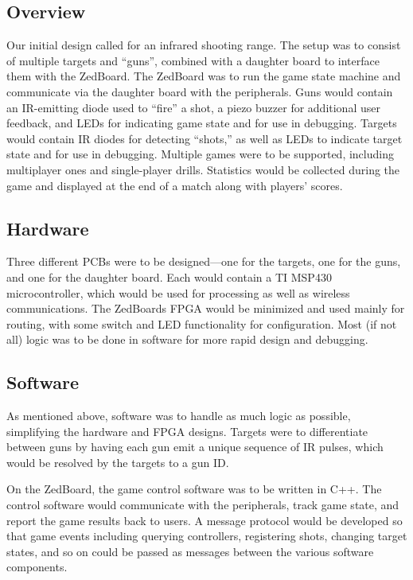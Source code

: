 \documentclass[oneside]{book}
\begin{document}
\subsection{Overview}

Our initial design called for an infrared shooting range.
The setup was to consist of multiple targets and ``guns'',
combined with a daughter board to interface them with the ZedBoard.
The ZedBoard was to run the game state machine and communicate via the daughter board
with the peripherals.
Guns would contain an IR-emitting diode used to ``fire'' a shot,
a piezo buzzer for additional user feedback,
and LEDs for indicating game state and for use in debugging.
Targets would contain IR diodes for detecting ``shots,''
as well as LEDs to indicate target state and for use in debugging.
Multiple games were to be supported,
including multiplayer ones and single-player drills.
Statistics would be collected during the game and displayed at the end of a match
along with players' scores.

\subsection{Hardware}

Three different PCBs were to be designed---one for the targets, one for the guns,
and one for the daughter board.
Each would contain a TI MSP430 microcontroller, which would be used for processing
as well as wireless communications.
The ZedBoards FPGA would be minimized and used mainly for routing,
with some switch and LED functionality for configuration.
Most (if not all) logic was to be done in software for more rapid design and debugging.

\subsection{Software}

As mentioned above, software was to handle as much logic as possible,
simplifying the hardware and FPGA designs.
Targets were to differentiate between guns by having each gun emit a unique
sequence of IR pulses, which would be resolved by the targets to a gun ID.

On the ZedBoard, the game control software was to be written in C++.
The control software would communicate with the peripherals, track game state,
and report the game results back to users.
A message protocol would be developed so that game events including querying controllers,
registering shots, changing target states, and so on could be passed as messages
between the various software components.
\end{document}
